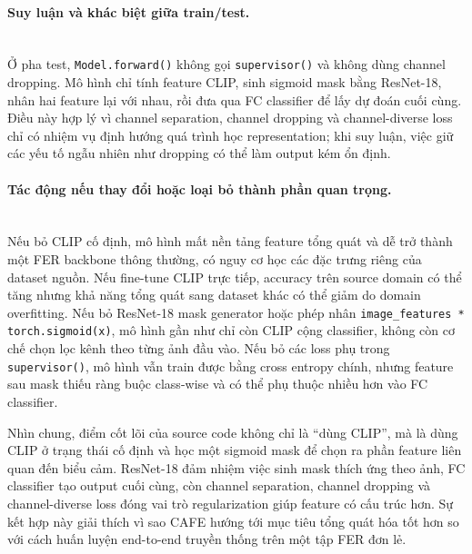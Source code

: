 \paragraph{Suy luận và khác biệt giữa train/test.}\mbox{}\\
Ở pha test, \texttt{Model.forward()} không gọi \texttt{supervisor()} và không dùng channel dropping. Mô hình chỉ tính feature CLIP, sinh sigmoid mask bằng ResNet-18, nhân hai feature lại với nhau, rồi đưa qua FC classifier để lấy dự đoán cuối cùng. Điều này hợp lý vì channel separation, channel dropping và channel-diverse loss chỉ có nhiệm vụ định hướng quá trình học representation; khi suy luận, việc giữ các yếu tố ngẫu nhiên như dropping có thể làm output kém ổn định.

\paragraph{Tác động nếu thay đổi hoặc loại bỏ thành phần quan trọng.}\mbox{}\\
Nếu bỏ CLIP cố định, mô hình mất nền tảng feature tổng quát và dễ trở thành một FER backbone thông thường, có nguy cơ học các đặc trưng riêng của dataset nguồn. Nếu fine-tune CLIP trực tiếp, accuracy trên source domain có thể tăng nhưng khả năng tổng quát sang dataset khác có thể giảm do domain overfitting. Nếu bỏ ResNet-18 mask generator hoặc phép nhân \texttt{image\_features * torch.sigmoid(x)}, mô hình gần như chỉ còn CLIP cộng classifier, không còn cơ chế chọn lọc kênh theo từng ảnh đầu vào. Nếu bỏ các loss phụ trong \texttt{supervisor()}, mô hình vẫn train được bằng cross entropy chính, nhưng feature sau mask thiếu ràng buộc class-wise và có thể phụ thuộc nhiều hơn vào FC classifier.

Nhìn chung, điểm cốt lõi của source code không chỉ là ``dùng CLIP'', mà là dùng CLIP ở trạng thái cố định và học một sigmoid mask để chọn ra phần feature liên quan đến biểu cảm. ResNet-18 đảm nhiệm việc sinh mask thích ứng theo ảnh, FC classifier tạo output cuối cùng, còn channel separation, channel dropping và channel-diverse loss đóng vai trò regularization giúp feature có cấu trúc hơn. Sự kết hợp này giải thích vì sao CAFE hướng tới mục tiêu tổng quát hóa tốt hơn so với cách huấn luyện end-to-end truyền thống trên một tập FER đơn lẻ.


